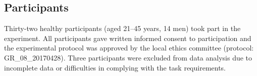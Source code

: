 \subsection{Participants} Thirty-two healthy participants (aged 21--45 years, 14 men) took part in the experiment. All participants gave written informed consent to participation and the experimental protocol was approved by the local ethics committee (protocol: GR\_08\_20170428). Three participants were excluded from data analysis due to incomplete data or difficulties in complying with the task requirements.
